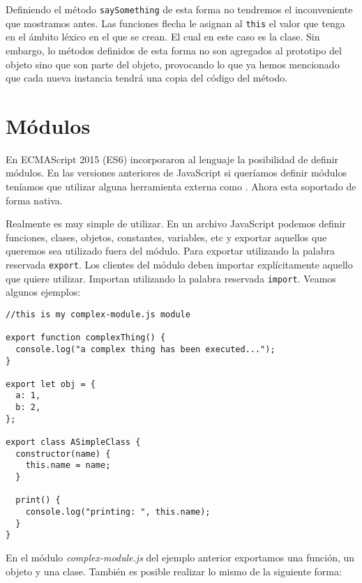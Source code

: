 \documentclass[a4paper, oneside, titlepage, 12pt]{book}
\begin{document}
Definiendo el método \texttt{saySomething} de esta forma no tendremos el inconveniente que mostramos antes. Las funciones flecha le asignan al \texttt{this} el valor que tenga en el ámbito léxico en el que se crean. El cual en este caso es la clase. Sin embargo, lo métodos definidos de esta forma no son agregados al prototipo del objeto sino que son parte del objeto, provocando lo que ya hemos mencionado que cada nueva instancia tendrá una copia del código del método.

\section{Módulos}

En ECMAScript 2015 (ES6) incorporaron al lenguaje la posibilidad de definir módulos. En las versiones anteriores de JavaScript si queríamos definir módulos teníamos que utilizar alguna herramienta externa como \cite{requirejs}. Ahora esta soportado de forma nativa. 
\newline

Realmente es muy simple de utilizar. En un archivo JavaScript podemos definir funciones, clases, objetos, constantes, variables, etc y exportar aquellos que queremos sea utilizado fuera del módulo. Para exportar utilizando la palabra reservada \texttt{export}. Los clientes del módulo deben importar explícitamente aquello que quiere utilizar. Importan utilizando la palabra reservada \texttt{import}. Veamos algunos ejemplos:
 
\begin{verbatim}
//this is my complex-module.js module

export function complexThing() {
  console.log("a complex thing has been executed...");
}

export let obj = {
  a: 1,
  b: 2,
};

export class ASimpleClass {
  constructor(name) {
    this.name = name;
  }

  print() {
    console.log("printing: ", this.name);
  }
}
\end{verbatim}

En el módulo \textit{complex-module.js} del ejemplo anterior exportamos una función, un objeto y una clase. También es posible realizar lo mismo de la siguiente forma:
\end{document}
